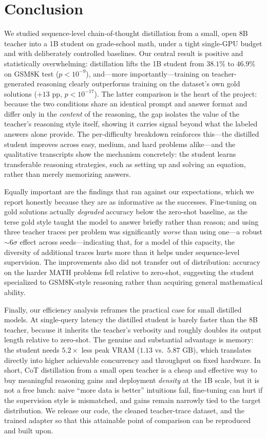 \documentclass[11pt]{article}
\begin{document}
\section{Conclusion}
We studied sequence-level chain-of-thought distillation from a small, open 8B
teacher into a 1B student on grade-school math, under a tight single-GPU budget and
with deliberately controlled baselines. Our central result is positive and
statistically overwhelming: distillation lifts the 1B student from $38.1\%$ to
$46.9\%$ on GSM8K test ($p<10^{-9}$), and---more importantly---training on
teacher-generated reasoning clearly outperforms training on the dataset's own gold
solutions ($+13$ pp, $p<10^{-17}$). The latter comparison is the heart of the
project: because the two conditions share an identical prompt and answer format and
differ only in the \emph{content} of the reasoning, the gap isolates the value of
the teacher's reasoning style itself, showing it carries signal beyond what the
labeled answers alone provide. The per-difficulty breakdown reinforces this---the
distilled student improves across easy, medium, and hard problems alike---and the
qualitative transcripts show the mechanism concretely: the student learns
transferable reasoning strategies, such as setting up and solving an equation,
rather than merely memorizing answers.

Equally important are the findings that ran against our expectations, which we
report honestly because they are as informative as the successes. Fine-tuning on
gold solutions actually \emph{degraded} accuracy below the zero-shot baseline, as
the terse gold style taught the model to answer briefly rather than reason; and
using three teacher traces per problem was significantly \emph{worse} than using
one---a robust $\sim$6$\sigma$ effect across seeds---indicating that, for a model of
this capacity, the diversity of additional traces hurts more than it helps under
sequence-level supervision. The improvements also did not transfer out of
distribution: accuracy on the harder MATH problems fell relative to zero-shot,
suggesting the student specialized to GSM8K-style reasoning rather than acquiring
general mathematical ability.

Finally, our efficiency analysis reframes the practical case for small distilled
models. At single-query latency the distilled student is barely faster than the 8B
teacher, because it inherits the teacher's verbosity and roughly doubles its output
length relative to zero-shot. The genuine and substantial advantage is memory: the
student needs $5.2\times$ less peak VRAM ($1.13$ vs.\ $5.87$ GB), which translates
directly into higher achievable concurrency and throughput on fixed hardware. In
short, CoT distillation from a small open teacher is a cheap and effective way to
buy meaningful reasoning gains and deployment \emph{density} at the 1B scale, but it
is not a free lunch: naive ``more data is better'' intuitions fail, fine-tuning can
hurt if the supervision style is mismatched, and gains remain narrowly tied to the
target distribution. We release our code, the cleaned teacher-trace dataset, and the
trained adapter so that this attainable point of comparison can be reproduced and
built upon.
\end{document}
